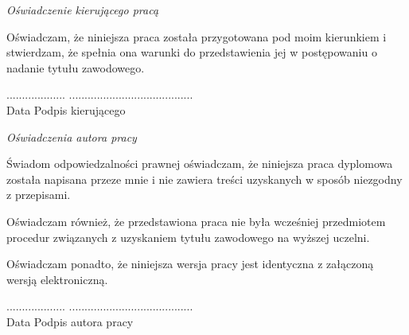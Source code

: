 \newpage
\thispagestyle{empty}
\vspace*{2cm}
\noindent
\emph{Oświadczenie kierującego pracą}
\vspace{0.6cm}


\noindent Oświadczam, że niniejsza praca została przygotowana pod moim kierunkiem i stwierdzam, że spełnia ona warunki do przedstawienia jej w postępowaniu o nadanie tytułu zawodowego.
\vspace{1cm}

\noindent ................... \hfill ........................................\\
 Data \hfill Podpis kierującego
\vspace{3cm}

\noindent \emph{Oświadczenia autora pracy}
\vspace{0.6cm}


\noindent Świadom odpowiedzalności prawnej oświadczam, że niniejsza praca dyplomowa została napisana przeze mnie i nie zawiera treści uzyskanych w sposób niezgodny z przepisami.
\vspace{0.3cm}

\noindent Oświadczam również, że przedstawiona praca nie była wcześniej przedmiotem procedur związanych z uzyskaniem tytułu zawodowego na wyższej uczelni.
\vspace{0.3cm}

\noindent Oświadczam ponadto, że niniejsza wersja pracy jest identyczna z załączoną wersją elektroniczną.
\vspace{1cm}

\noindent ................... \hfill ........................................\\
 Data \hfill Podpis autora pracy
